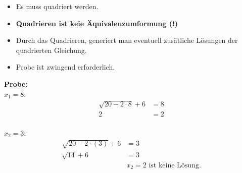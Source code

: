 \documentclass[
  ignorenonframetext,
  aspectratio=169,
]{beamer}
\providecommand{\tightlist}{%
  \setlength{\itemsep}{0pt}\setlength{\parskip}{0pt}}\usepackage{longtable,booktabs,array}
\begin{document}
\begin{frame}
\begin{itemize}
\tightlist
\item
  Es muss quadriert werden.
\item
  \textbf{Quadrieren ist keie Äquivalenzumformung (!)}
\item
  Durch das Quadrieren, generiert man eventuell zusätliche Lösungen der
  quadrierten Gleichung.
\item
  Probe ist zwingend erforderlich.
\end{itemize}
\end{frame}

\begin{frame}
\textbf{Probe:}\\
\(x_1 = 8\): \[
\begin{aligned}
\sqrt{20-2\cdot8}+6 &= 8\\
2 &= 2\\
\end{aligned}
\]

\(x_2 = 3\): \[
\begin{aligned}
\sqrt{20-2\cdot(3)} +6 &= 3\\
\sqrt{14} +6 &= 3\\
 & x_2=2 \text{ ist keine Lösung.}
\end{aligned}
\]
\end{frame}
\end{document}
